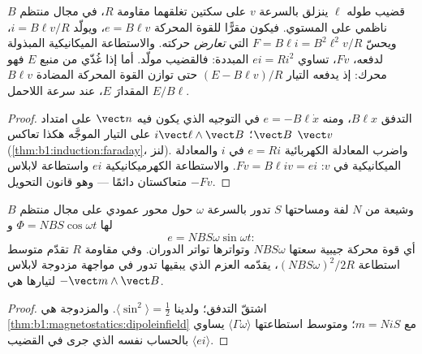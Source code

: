 \begin{proposition}\label{prop:b1:induction:rails}
قضيب طوله $\ell$ ينزلق بالسرعة $v$ على سكتين تغلقهما
مقاومة $R$، في مجال منتظم $B$ ناظمي على المستوي. فيكون
مقرًّا للقوة المحركة $e = B\ell v$، ويولّد $i = B\ell v/R$، ويحسّ
 $F = B\ell i = B^2\ell^2v/R$ التي \emph{تعارض} حركته.
والاستطاعة الميكانيكية المبذولة لدفعه، $Fv$، تساوي  $ei = Ri^2$ المبددة: فالقضيب مولّد. أما إذا غُذّي من
منبع $E$ فهو محرك: إذ يدفعه التيار $(E - B\ell v)/R$
حتى توازن القوة المحركة المضادة $B\ell v$ المقدارَ $E$، عند سرعة اللاحمل $E/B\ell$.
\end{proposition}

\begin{proof}
التدفق $B\ell x$، ومنه $e = -B\ell\dot x$ في التوجيه الذي يكون فيه $\vect n$
على امتداد $\vect B$؛  $i\vect\ell\wedge\vect B$ على التيار
الموجَّه هكذا تعاكس $\vect v$ (\cref{thm:b1:induction:faraday}،
لنز). واضرب المعادلة الكهربائية $e = Ri$ في $i$ والمعادلة
الميكانيكية في $v$: $Fv = B\ell iv = ei$. والاستطاعة
الكهرميكانيكية $ei$ واستطاعة لابلاس $-Fv$ متعاكستان دائمًا --- وهو قانون
التحويل.
\end{proof}

\begin{proposition}\label{prop:b1:induction:alternator}
وشيعة من $N$ لفة ومساحتها $S$ تدور بالسرعة $\omega$ حول محور
عمودي على مجال منتظم $B$ لها $\Phi = NBS\cos\omega t$ و
\[
e = NBS\omega\sin\omega t :
\]
أي قوة محركة جيبية سعتها $NBS\omega$ وتواترها تواتر الدوران.
وفي مقاومة $R$ تقدّم متوسط استطاعة $(NBS\omega)^2/2R$،
يقدّمه العزم الذي يبقيها تدور في مواجهة مزدوجة
لابلاس $-\vect m\wedge\vect B$ لتيارها هي.
\end{proposition}

\begin{proof}
اشتقّ التدفق؛ ولدينا $\langle\sin^2\rangle = \tfrac12$. والمزدوجة هي
\cref{thm:b1:magnetostatics:dipoleinfield} مع $m = Ni S$؛ ومتوسط
استطاعتها $\langle\Gamma\omega\rangle$ يساوي $\langle ei\rangle$ بالحساب
نفسه الذي جرى في القضيب.
\end{proof}

